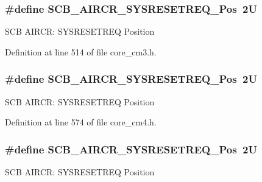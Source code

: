 \subsubsection[{\texorpdfstring{S\+C\+B\+\_\+\+A\+I\+R\+C\+R\+\_\+\+S\+Y\+S\+R\+E\+S\+E\+T\+R\+E\+Q\+\_\+\+Pos}{SCB_AIRCR_SYSRESETREQ_Pos}}]{\setlength{\rightskip}{0pt plus 5cm}\#define S\+C\+B\+\_\+\+A\+I\+R\+C\+R\+\_\+\+S\+Y\+S\+R\+E\+S\+E\+T\+R\+E\+Q\+\_\+\+Pos~2U}\hypertarget{group___c_m_s_i_s___s_c_b_gaffb2737eca1eac0fc1c282a76a40953c}{}\label{group___c_m_s_i_s___s_c_b_gaffb2737eca1eac0fc1c282a76a40953c}
S\+CB A\+I\+R\+CR\+: S\+Y\+S\+R\+E\+S\+E\+T\+R\+EQ Position 

Definition at line 514 of file core\+\_\+cm3.\+h.

\subsubsection[{\texorpdfstring{S\+C\+B\+\_\+\+A\+I\+R\+C\+R\+\_\+\+S\+Y\+S\+R\+E\+S\+E\+T\+R\+E\+Q\+\_\+\+Pos}{SCB_AIRCR_SYSRESETREQ_Pos}}]{\setlength{\rightskip}{0pt plus 5cm}\#define S\+C\+B\+\_\+\+A\+I\+R\+C\+R\+\_\+\+S\+Y\+S\+R\+E\+S\+E\+T\+R\+E\+Q\+\_\+\+Pos~2U}\hypertarget{group___c_m_s_i_s___s_c_b_gaffb2737eca1eac0fc1c282a76a40953c}{}\label{group___c_m_s_i_s___s_c_b_gaffb2737eca1eac0fc1c282a76a40953c}
S\+CB A\+I\+R\+CR\+: S\+Y\+S\+R\+E\+S\+E\+T\+R\+EQ Position 

Definition at line 574 of file core\+\_\+cm4.\+h.

\subsubsection[{\texorpdfstring{S\+C\+B\+\_\+\+A\+I\+R\+C\+R\+\_\+\+S\+Y\+S\+R\+E\+S\+E\+T\+R\+E\+Q\+\_\+\+Pos}{SCB_AIRCR_SYSRESETREQ_Pos}}]{\setlength{\rightskip}{0pt plus 5cm}\#define S\+C\+B\+\_\+\+A\+I\+R\+C\+R\+\_\+\+S\+Y\+S\+R\+E\+S\+E\+T\+R\+E\+Q\+\_\+\+Pos~2U}\hypertarget{group___c_m_s_i_s___s_c_b_gaffb2737eca1eac0fc1c282a76a40953c}{}\label{group___c_m_s_i_s___s_c_b_gaffb2737eca1eac0fc1c282a76a40953c}
S\+CB A\+I\+R\+CR\+: S\+Y\+S\+R\+E\+S\+E\+T\+R\+EQ Position 

